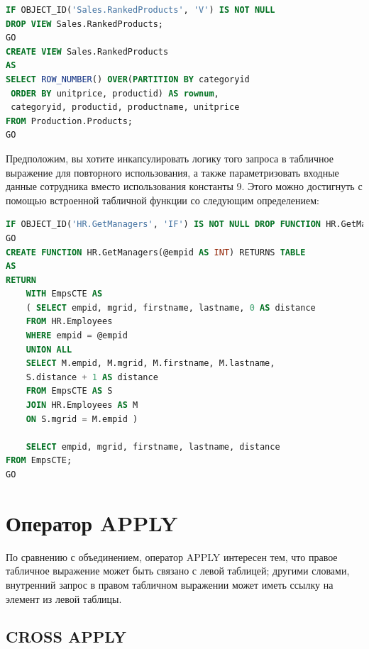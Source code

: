 \begin{lstlisting}[label=lst:funcReturn, language=sql]
IF OBJECT_ID('Sales.RankedProducts', 'V') IS NOT NULL
DROP VIEW Sales.RankedProducts;
GO
CREATE VIEW Sales.RankedProducts
AS
SELECT ROW_NUMBER() OVER(PARTITION BY categoryid
 ORDER BY unitprice, productid) AS rownum,
 categoryid, productid, productname, unitprice
FROM Production.Products;
GO 
\end{lstlisting}

Предположим, вы хотите инкапсулировать логику того запроса в табличное выражение для повторного использования,
а также параметризовать входные данные сотрудника вместо использования константы 9. Этого можно достигнуть с помощью встроенной табличной функции со
следующим определением:

\begin{lstlisting}[label=lst:funcReturn, language=sql]
IF OBJECT_ID('HR.GetManagers', 'IF') IS NOT NULL DROP FUNCTION HR.GetManagers;
GO
CREATE FUNCTION HR.GetManagers(@empid AS INT) RETURNS TABLE
AS
RETURN
	WITH EmpsCTE AS
	( SELECT empid, mgrid, firstname, lastname, 0 AS distance
	FROM HR.Employees
	WHERE empid = @empid
	UNION ALL
	SELECT M.empid, M.mgrid, M.firstname, M.lastname,
	S.distance + 1 AS distance
	FROM EmpsCTE AS S
	JOIN HR.Employees AS M
	ON S.mgrid = M.empid )

	SELECT empid, mgrid, firstname, lastname, distance
FROM EmpsCTE;
GO 
\end{lstlisting}


\section{Оператор APPLY}
По сравнению с объединением, оператор APPLY интересен тем,
что правое табличное выражение может быть связано с левой таблицей; другими
словами, внутренний запрос в правом табличном выражении может иметь ссылку
на элемент из левой таблицы.

\subsection{CROSS APPLY}


